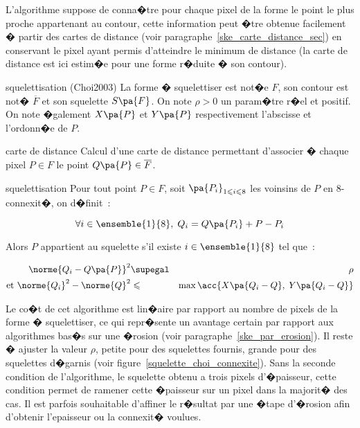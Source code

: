 
L'algorithme suppose de conna�tre pour chaque pixel de la forme le point le plus proche appartenant au contour, cette information peut �tre obtenue facilement � partir des cartes de distance (voir paragraphe~\ref{ske_carte_distance_sec}) en conservant le pixel ayant permis d'atteindre le minimum de distance (la carte de distance est ici estim�e pour une forme r�duite � son contour).

        \begin{xalgorithm}{squelettisation (Choi2003)}
        La forme � squelettiser est not�e $F$, son contour est not� $\overline{F}$ et son squelette $S\pa{F}$. 
        On note $\rho > 0$ un param�tre r�el et positif. On note �galement $X\pa{P}$ et $Y\pa{P}$ 
        respectivement l'abscisse et l'ordonn�e de $P$.
        
        \begin{xalgostep}{carte de distance}
        Calcul d'une carte de distance permettant d'associer � chaque pixel $P \in F$ 
        le point $Q\pa{P} \in \overline{F}$.
        \end{xalgostep}
        
        \begin{xalgostep}{squelettisation}
        Pour tout point $P \in F$, soit $\pa{P_i}_{1 \leqslant i \leqslant 8}$ les voinsins de $P$ 
        en 8-connexit�, on d�finit~:
        
                $$
                \forall i \in \ensemble{1}{8}, \; Q_i = Q\pa{P_i} + P - P_i
                $$
                
        Alors $P$ appartient au squelette s'il existe $i \in \ensemble{1}{8}$ tel que~:
        
                \begin{eqnarray}
                \norme{Q_i - Q\pa{P}}^2         &\supegal& \rho  \label{squelette_choi_condition_1}\\
                \text{et } \norme{Q_i}^2 - \norme{Q}^2    &\leqslant& \max \acc{ X\pa{Q_i - Q}, \; Y\pa{Q_i - Q}}
                \end{eqnarray}
                
        \end{xalgostep}
        \end{xalgorithm}


Le co�t de cet algorithme est lin�aire par rapport au nombre de pixels de la forme � squelettiser, ce qui repr�sente un avantage certain par rapport aux algorithmes bas�s sur une �rosion (voir paragraphe~\ref{ske_par_erosion}). Il reste � ajuster la valeur $\rho$, petite pour des squelettes fournis, grande pour des squelettes d�garnis (voir figure~\ref{squelette_choi_connexite}). Sans la seconde condition de l'algorithme, le squelette obtenu a trois pixels d'�paisseur, cette condition permet de ramener cette �paisseur sur un pixel dans la majorit� des cas. Il est parfois souhaitable d'affiner le r�sultat par une �tape d'�rosion afin d'obtenir l'epaisseur ou la connexit� voulues.




